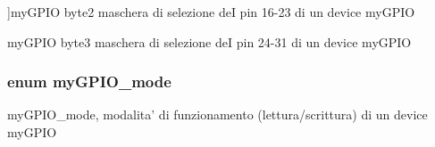 \begin{Desc}
\begin{description}
{}]my\+G\+P\+I\+O byte2 maschera di selezione de\+I pin 16-\/23 di un device my\+G\+P\+I\+O \item[{\em 
\hypertarget{group__bare-metal_gga402a0d20afc0cb7c25554b8b023f4253a1ceefb9d65397352e986c573984d0129}{my\+G\+P\+I\+O\+\_\+byte3}\label{group__bare-metal_gga402a0d20afc0cb7c25554b8b023f4253a1ceefb9d65397352e986c573984d0129}
}]my\+G\+P\+I\+O byte3 maschera di selezione de\+I pin 24-\/31 di un device my\+G\+P\+I\+O \end{description}
\end{Desc}
\hypertarget{group__bare-metal_ga76b849f0e0c05e7f9161bdb33396f2b1}{
\subsubsection[{my\+G\+P\+I\+O\+\_\+mode}]{\setlength{\rightskip}{0pt plus 5cm}enum {\bf my\+G\+P\+I\+O\+\_\+mode}}}\label{group__bare-metal_ga76b849f0e0c05e7f9161bdb33396f2b1}


my\+G\+P\+I\+O\+\_\+mode, modalita' di funzionamento (lettura/scrittura) di un device my\+G\+P\+I\+O 

